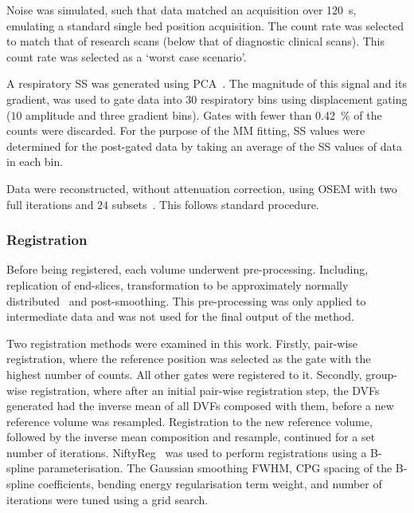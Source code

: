                 Noise was simulated, such that data matched an acquisition over \SI{120}{\second}, emulating a standard single bed position acquisition. The count rate was selected to match that of research scans (below that of diagnostic clinical scans). This count rate was selected as a `worst case scenario'.
                
                A respiratory \gls{SS} was generated using \gls{PCA}~\parencite{Thielemans2011}. The magnitude of this signal and its gradient, was used to gate data into $30$ respiratory bins using displacement gating ($10$ amplitude and three gradient bins). Gates with fewer than \SI{0.42}{\percent} of the counts were discarded. For the purpose of the \gls{MM} fitting, \gls{SS} values were determined for the post-gated data by taking an average of the \gls{SS} values of data in each bin.
                
                Data were reconstructed, without attenuation correction, using \gls{OSEM} with two full iterations and $24$ subsets~\parencite{Hudson1994}. This follows standard procedure.
            
            \subsubsection{Registration} \label{sec:comparison_of_motion_correction_methods_incorporating_motion_modelling_for_pet_ct_using_a_single_breath_hold_attenuation_map_registration}
                Before being registered, each volume underwent pre-processing. Including, replication of end-slices, transformation to be approximately normally distributed~\parencite{Johnson2013} and post-smoothing. This pre-processing was only applied to intermediate data and was not used for the final output of the method.%
                
                Two registration methods were examined in this work. Firstly, pair-wise registration, where the reference position was selected as the gate with the highest number of counts. All other gates were registered to it. Secondly, group-wise registration, where after an initial pair-wise registration step, the \glspl{DVF} generated had the inverse mean of all \glspl{DVF} composed with them, before a new reference volume was resampled. Registration to the new reference volume, followed by the inverse mean composition and resample, continued for a set number of iterations. NiftyReg~\parencite{Modat2010} was used to perform registrations using a B-spline parameterisation. The Gaussian smoothing \gls{FWHM}, \gls{CPG} spacing of the B-spline coefficients, bending energy regularisation term weight, and number of iterations were tuned using a grid search.
            
